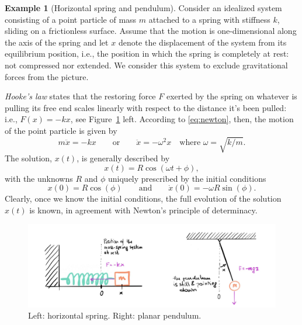 \documentclass[english,fontsize=11pt,paper=b5]{scrbook}
\theoremstyle{definition}
\newtheorem{example}{Example}[chapter]
\begin{document}
  \begin{example}[Horizontal spring and pendulum]\label{ex:sprPen}
    Consider an idealized system consisting of a point particle of mass $m$ attached to a spring with stiffness $k$, sliding on a frictionless surface.
    Assume that the motion is one-dimensional along the axis of the spring and let $x$ denote the displacement of the system from its equilibrium position, i.e., the position in which the spring is completely at rest: not compressed nor extended. We consider this system to exclude gravitational forces from the picture.

    \emph{Hooke's law} states that the restoring force $F$ exerted by the spring on whatever is pulling its free end scales linearly with respect to the distance it's been pulled: i.e., $F(x) = - k x$, see Figure~\ref{fig:spring-pendulum} left. According to \eqref{eq:newton}, then, the motion of the point particle is given by
    \begin{equation}\label{eq:spring}
      m \ddot{x} = - k x \qquad\mbox{or}\qquad \ddot{x} = - \omega^2 x \quad\mbox{where } \omega = \sqrt{k/m}.
    \end{equation}
    The solution, $x(t)$, is generally described by
    \begin{equation}\label{eq:springsol}
      x(t) = R \cos(\omega t + \phi),
    \end{equation} with the unknowns $R$ and $\phi$ uniquely prescribed by the initial conditions
    \begin{equation}
      x(0) = R\cos(\phi) \qquad\mbox{and}\qquad \dot x(0) = -\omega R \sin(\phi).
    \end{equation}
    Clearly, once we know the initial conditions, the full evolution of the solution $x(t)$ is known, in agreement with Newton's principle of determinacy. \medskip

    \begin{figure}[ht!]
      \includegraphics[width=.9\linewidth]{images/HM-1-2.pdf}
      \caption{Left: horizontal spring. Right: planar pendulum.}%
      \label{fig:spring-pendulum}
    \end{figure}


\end{example}
\end{document}
